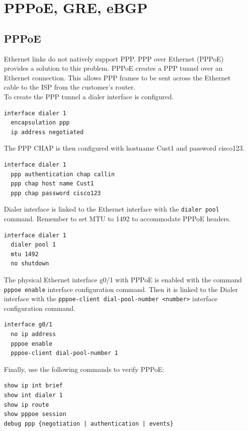 \chapter{PPPoE, GRE, eBGP}

\section{PPPoE}

Ethernet links do not natively support PPP. PPP over Ethernet (PPPoE) provides a solution to this problem. PPPoE creates a PPP tunnel over an Ethernet connection. This allows PPP frames to be sent across the Ethernet cable to the ISP from the customer’s router.\\

To create the PPP tunnel a dialer interface is configured.

\begin{verbatim}
interface dialer 1
  encapsulation ppp
  ip address negotiated
\end{verbatim}

The PPP CHAP is then configured with hostname Cust1 and password cisco123.
 
\begin{verbatim}
interface dialer 1
  ppp authentication chap callin
  ppp chap host name Cust1
  ppp chap password cisco123
\end{verbatim}

Dialer interface is linked to the Ethernet interface with the \verb|dialer pool| command. Remember to set MTU to 1492 to accommodate PPPoE headers.

\begin{verbatim}
interface dialer 1
  dialer pool 1
  mtu 1492
  no shutdown
\end{verbatim}

The physical Ethernet interface g0/1 with PPPoE is enabled with the command \verb|pppoe enable| interface configuration command. Then it is linked to the Dialer interface with the \verb|pppoe-client dial-pool-number <number>| interface configuration command.

\begin{verbatim}
interface g0/1
  no ip address
  pppoe enable
  pppoe-client dial-pool-number 1
\end{verbatim}

Finally, use the following commands to verify PPPoE:

\begin{verbatim}
show ip int brief
show int dialer 1
show ip route
show pppoe session
debug ppp {negotiation | authentication | events}
\end{verbatim}


